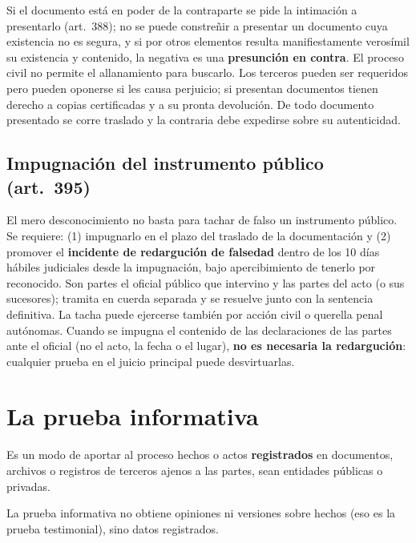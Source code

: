 \documentclass[12pt,oneside]{book}
\begin{document}
Si el documento está en poder de la contraparte se pide la intimación a presentarlo (art.~388); no se puede constreñir a presentar un documento cuya existencia no es segura, y si por otros elementos resulta manifiestamente verosímil su existencia y contenido, la negativa es una \textbf{presunción en contra}. El proceso civil no permite el allanamiento para buscarlo. Los terceros pueden ser requeridos pero pueden oponerse si les causa perjuicio; si presentan documentos tienen derecho a copias certificadas y a su pronta devolución. De todo documento presentado se corre traslado y la contraria debe expedirse sobre su autenticidad.

\subsection{Impugnación del instrumento público (art.~395)}

El mero desconocimiento no basta para tachar de falso un instrumento público. Se requiere: (1) impugnarlo en el plazo del traslado de la documentación y (2) promover el \textbf{incidente de redargución de falsedad} dentro de los 10 días hábiles judiciales desde la impugnación, bajo apercibimiento de tenerlo por reconocido. %
Son partes el oficial público que intervino y las partes del acto (o sus sucesores); tramita en cuerda separada y se resuelve junto con la sentencia definitiva. La tacha puede ejercerse también por acción civil o querella penal autónomas. Cuando se impugna el contenido de las declaraciones de las partes ante el oficial (no el acto, la fecha o el lugar), \textbf{no es necesaria la redargución}: cualquier prueba en el juicio principal puede desvirtuarlas.

\section{La prueba informativa}

Es un modo de aportar al proceso hechos o actos \textbf{registrados} en documentos, archivos o registros de terceros ajenos a las partes, sean entidades públicas o privadas.

\begin{important}
La prueba informativa no obtiene opiniones ni versiones sobre hechos (eso es la prueba testimonial), sino datos registrados.
\end{important}
\end{document}
